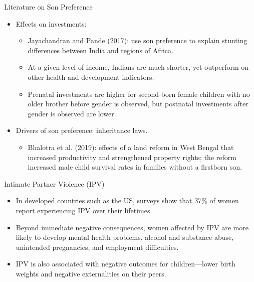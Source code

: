 \documentclass[11pt,notes=hide,aspectratio=169,mathserif]{beamer}
\begin{document}
\begin{frame}{Literature on Son Preference}
\begin{itemize}
  \item Effects on investments:
  \begin{itemize}
    \item Jayachandran and Pande (2017): use son preference to explain stunting differences between India and regions of Africa.
    \item At a given level of income, Indians are much shorter, yet outperform on other health and development indicators.
    \item Prenatal investments are higher for second-born female children with no older brother before gender is observed, but postnatal investments after gender is observed are lower.
  \end{itemize}
  \item Drivers of son preference: inheritance laws.
  \begin{itemize}
    \item Bhalotra et al. (2019): effects of a land reform in West Bengal that increased productivity and strengthened property rights; the reform increased male child survival rates in families without a firstborn son.
  \end{itemize}
\end{itemize}
\end{frame}

\begin{frame}{Intimate Partner Violence (IPV)}
\begin{itemize}
  \item In developed countries such as the US, surveys show that 37\% of women report experiencing IPV over their lifetimes.
  \item Beyond immediate negative consequences, women affected by IPV are more likely to develop mental health problems, alcohol and substance abuse, unintended pregnancies, and employment difficulties.
  \item IPV is also associated with negative outcomes for children—lower birth weights and negative externalities on their peers.
\end{itemize}
\end{frame}
\end{document}
